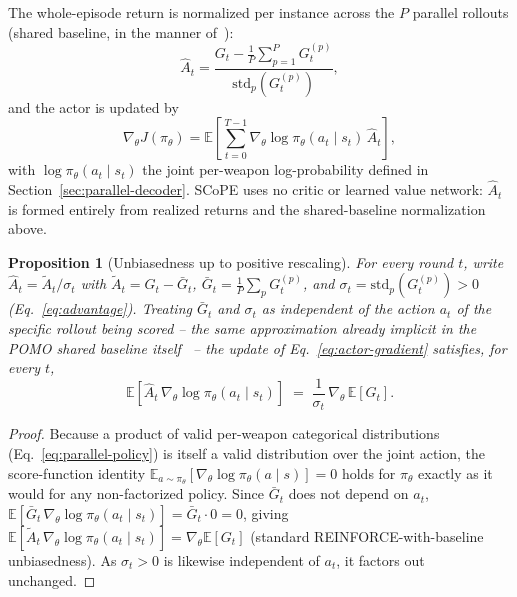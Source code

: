\documentclass[smallcondensed]{svjour3}
\newtheorem{proposition}{Proposition}
\begin{document}
The whole-episode return is normalized per instance across the $P$ parallel rollouts (shared baseline, in the manner of~\cite{kwon2020pomo}):
\begin{equation}
\label{eq:advantage}
\hat{A}_t = \frac{G_t - \frac{1}{P}\sum_{p=1}^P G_t^{(p)}}{\text{std}_p\!\left(G_t^{(p)}\right)},
\end{equation}
and the actor is updated by
\begin{equation}
\label{eq:actor-gradient}
\nabla_\theta J(\pi_\theta) = \mathbb{E}\!\left[\sum_{t=0}^{T-1} \nabla_\theta \log \pi_\theta(a_t \mid s_t)\, \hat{A}_t\right],
\end{equation}
with $\log \pi_\theta(a_t\mid s_t)$ the joint per-weapon log-probability defined in Section~\ref{sec:parallel-decoder}. SCoPE uses no critic or learned value network: $\hat{A}_t$ is formed entirely from realized returns and the shared-baseline normalization above.

\begin{proposition}[Unbiasedness up to positive rescaling]
\label{prop:unbiased}
For every round $t$, write $\hat A_t = \tilde A_t/\sigma_t$ with $\tilde A_t = G_t - \bar G_t$, $\bar G_t = \frac1P\sum_p G_t^{(p)}$, and $\sigma_t = \text{std}_p(G_t^{(p)}) > 0$ (Eq.~\eqref{eq:advantage}). Treating $\bar G_t$ and $\sigma_t$ as independent of the action $a_t$ of the specific rollout being scored -- the same approximation already implicit in the POMO shared baseline itself~\cite{kwon2020pomo} -- the update of Eq.~\eqref{eq:actor-gradient} satisfies, for every $t$,
\begin{equation}
\mathbb{E}\!\left[\hat A_t\,\nabla_\theta\log\pi_\theta(a_t\mid s_t)\right] \;=\; \frac{1}{\sigma_t}\,\nabla_\theta\,\mathbb{E}[G_t].
\end{equation}
\end{proposition}
\begin{proof}
Because a product of valid per-weapon categorical distributions (Eq.~\eqref{eq:parallel-policy}) is itself a valid distribution over the joint action, the score-function identity $\mathbb{E}_{a\sim\pi_\theta}[\nabla_\theta\log\pi_\theta(a\mid s)]=0$ holds for $\pi_\theta$ exactly as it would for any non-factorized policy. Since $\bar G_t$ does not depend on $a_t$, $\mathbb{E}[\bar G_t\,\nabla_\theta\log\pi_\theta(a_t\mid s_t)] = \bar G_t\cdot 0 = 0$, giving $\mathbb{E}[\tilde A_t\,\nabla_\theta\log\pi_\theta(a_t\mid s_t)] = \nabla_\theta\mathbb{E}[G_t]$ (standard REINFORCE-with-baseline unbiasedness). As $\sigma_t>0$ is likewise independent of $a_t$, it factors out unchanged.
\end{proof}
\end{document}
